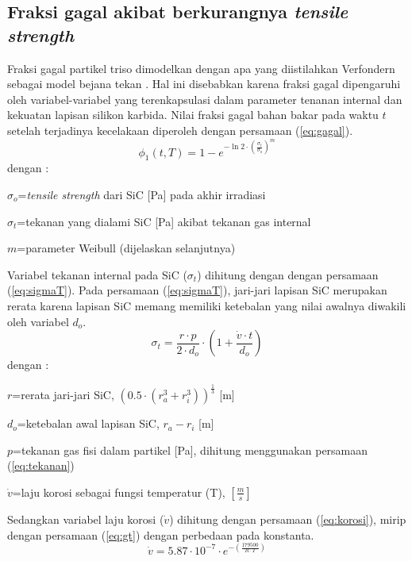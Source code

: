 \documentclass[a4paper,11pt]{report}
\begin{document}
\subsection{Fraksi gagal akibat berkurangnya \textit{tensile strength}}
Fraksi gagal partikel triso dimodelkan dengan apa yang diistilahkan Verfondern sebagai model bejana tekan \cite{report1}. Hal ini disebabkan karena  fraksi gagal dipengaruhi oleh variabel-variabel yang terenkapsulasi dalam parameter tenanan internal dan kekuatan lapisan silikon karbida. Nilai fraksi gagal bahan bakar pada waktu $t$ setelah terjadinya kecelakaan diperoleh dengan persamaan (\ref{eq:gagal}).
\begin{equation}
  \phi_1(t,T)=1-e^{-\ln 2 \cdot \left(\frac{\sigma_t}{\sigma_o}\right)^m}
  \label{eq:gagal}
\end{equation}
dengan :
\begin{description}
  \item $\sigma_o$=\textit{tensile strength} dari SiC [Pa] pada akhir irradiasi
  \item $\sigma_t$=tekanan yang dialami SiC [Pa] akibat tekanan gas internal
  \item $m$=parameter Weibull (dijelaskan selanjutnya)
\end{description}

Variabel tekanan internal pada SiC ($\sigma_t$) dihitung dengan dengan persamaan (\ref{eq:sigmaT}). Pada persamaan (\ref{eq:sigmaT}), jari-jari lapisan SiC merupakan rerata karena lapisan SiC memang memiliki ketebalan yang nilai awalnya diwakili oleh variabel $d_o$.
\begin{equation}
  \sigma_t =\frac{r \cdot p}{2 \cdot d_o} \cdot \left( 1+\frac{\dot{v} \cdot t}{d_o} \right)
  \label{eq:sigmaT}
\end{equation}
dengan :
\begin{description}
  \item $r$=rerata jari-jari SiC, $\left( 0.5 \cdot \left( r_a^3 + r_i^3 \right)\right)^{\frac{1}{3}}$ [m]
  \item $d_o$=ketebalan awal lapisan SiC, $r_a - r_i$ [m]
  \item $p$=tekanan gas fisi dalam partikel [Pa], dihitung menggunakan persamaan (\ref{eq:tekanan})
  \item $\dot{v}$=laju korosi sebagai fungsi temperatur (T), $\left[\frac{m}{s}\right]$
\end{description}

Sedangkan variabel laju korosi ($\dot{v}$) dihitung dengan persamaan (\ref{eq:korosi}), mirip dengan persamaan (\ref{eq:gt}) dengan perbedaan pada konstanta.
\begin{equation}
  \dot{v}=5.87 \cdot 10^{-7} \cdot e^{-\left( \frac{179500}{R \cdot T}\right)}
  \label{eq:korosi}
\end{equation}
\end{document}
